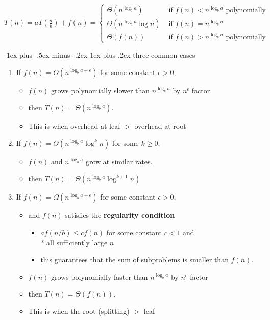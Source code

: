 \documentclass[10pt, landscape]{article}
\makeatletter
\renewcommand{\subsubsection}{\@startsection{subsubsection}{3}{0mm}%
  {-1ex plus -.5ex minus -.2ex}%
  {1ex plus .2ex}%
{\normalfont\small\bfseries}}%
\makeatother
\begin{document}
\begin{multicols*}{4}
  \begin{math}
    T(n) = aT(\frac{n}{b}) + f(n) = \begin{cases}
      \Theta(n^{\log_ba}) & \text{ if } f(n) < n^{\log_ba} \text{ polynomially}
      \\ \Theta(n^{\log_ba} \log n) & \text{ if } f(n) = n^{\log_ba} 
      \\ \Theta(f(n)) & \text{ if } f(n) > n^{\log_ba} \text{ polynomially}
    \end{cases}
  \end{math}

  \subsubsection{three common cases}

  \begin{enumerate}
    \item If $f(n) = O(n^{\log_b a-\epsilon})$ for some constant  $\epsilon > 0$, 
      \begin{itemize}
        \item $f(n)$ grows polynomially slower than $n^{\log_ba}$ by $n^\epsilon$ factor.
        \item then $T(n) = \Theta(n^{\log_ba})$.
        \item This is when overhead at leaf $>$ overhead at root
      \end{itemize}
    \item If $f(n) = \Theta(n^{\log_ba} \log^kn) $ for some $k \geq 0$,
      \begin{itemize}
        \item $f(n)$ and $n^{\log_ba}$ grow at similar rates.
        \item then $T(n) = \Theta(n^{\log_ba}\log^{k+1} n)$
      \end{itemize}
    \item If $f(n) = \Omega(n^{\log_ba + \epsilon})$ for some constant $\epsilon > 0$, 
      \begin{itemize}
        \item and $f(n)$ satisfies the \textbf{regularity condition} 
          \begin{itemize}
            \item $af(n/b) \leq cf(n)$ for some constant $c<1$ and \\* all sufficiently large $n$
            \item this guarantees that the sum of subproblems is smaller than $f(n)$.
          \end{itemize} 
        \item $f(n)$ grows polynomially faster than $n^{\log_ba}$ by $n^\epsilon$ factor
        \item then $T(n) = \Theta(f(n))$.
        \item This is when the root (splitting) $>$ leaf
      \end{itemize}
  \end{enumerate}


\end{multicols*}
\end{document}
